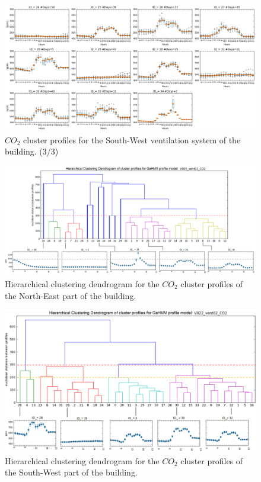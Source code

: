 \begin{landscape}
\begin{figure}[h!]
  \vspace{0.5em} %
  \includegraphics[scale=0.6]{Figures/candidates_CO2_SW_3.jpg}
  \caption{$CO_2$ cluster profiles for the South-West ventilation system of the building. (3/3) }
  \label{fig:candidates_profiles_SW}
\end{figure}


\begin{figure}[h!]
  \vspace{0.5em} %
  \includegraphics[scale=0.65]{Figures/dendrogram_CO2_NE_complete.jpg}
  \caption{Hierarchical clustering dendrogram for the $CO_2$ cluster profiles of the North-East part of the building.}
  \label{fig:dendrogram_CO2_NE_complete}
\end{figure}

\begin{figure}[h!]
  \vspace{0.5em} %
  \includegraphics[scale=0.68]{Figures/dendrogram_CO2_SW_complete.jpg}
  \caption{Hierarchical clustering dendrogram for the $CO_2$ cluster profiles of the South-West part of the building.}
  \label{fig:dendrogram_CO2_SW_complete}
\end{figure}



\end{landscape}
